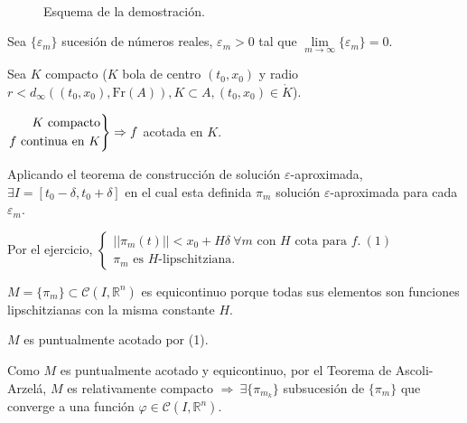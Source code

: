 \documentclass[11pt, a4paper,twoside]{article}
\makeatletter
\theoremstyle{theorem-style}  %
\renewenvironment{proof}[1][\proofname]{\par
	\pushQED{\qed}%
	\normalfont \topsep6\p@\@plus6\p@\relax
	\list{}{%
		\settowidth{\leftmargin}{\quad:\hskip\labelsep}%
		\setlength{\labelwidth}{0pt}%
		\setlength{\itemindent}{-\leftmargin}%
	}%
	\item[\hskip\labelsep\itshape#1\@addpunct{:}]\ignorespaces
}{%
	\popQED\endlist\@endpefalse
}
\theoremstyle{definition-style}
\theoremstyle{example-style}
\newenvironment{rcases}
{\left.\begin{aligned}}
	{\end{aligned}\right\rbrace}
\makeatother
\begin{document}
\begin{proof} \ \\
	\begin{figure}[h]
		\centering
		\caption{Esquema de la demostración.} \label{M2}
	\end{figure}
	Sea $ \{\varepsilon_m \} $ sucesión de números reales, $ \varepsilon_m>0  $ tal que $ \lim\limits_{m\to\infty} \{\varepsilon_m\} =0$.
	
	Sea $ K $ compacto ($ K $ bola de centro $ (t_0,x_0) $ y radio $ r<d_\infty((t_0,x_0), \text{Fr}(A)), K\subset A, (t_0,x_0) \in \mathring{K} $).
	
	$ \begin{rcases}
	K \text{ compacto}\\
	f \text{ continua en } K
	\end{rcases} \Rightarrow  f $ acotada en $ K $.
	
	Aplicando el teorema de construcción de solución $ \varepsilon $-aproximada, $ \exists I=[t_0-\delta, t_0+\delta] $ en el cual esta definida $ \pi_m $ solución  $ \varepsilon $-aproximada para cada $ \varepsilon_m $.
	
	Por el ejercicio, $ \begin{cases}
		||\pi_m(t)||< x_0+H\delta \ \forall m \text{ con } H \text{ cota para } f.\ (1)\\
		\pi_m \text{ es } H\text{-lipschitziana.}
	\end{cases} $
	
	$ M = \{\pi_m\} \subset  \mathcal{C} (I, \mathbb{R}^n)$ es equicontinuo porque todas sus elementos son funciones lipschitzianas con la misma constante $ H $.
	
	$ M $ es puntualmente acotado por (1). 
	
	Como $ M $ es puntualmente acotado y equicontinuo, por el Teorema de Ascoli-Arzelá, $ M$ es relativamente compacto $ \Rightarrow \ \exists \{\pi_{m_k}\}$ subsucesión de $ \{\pi_m\} $ que converge a una función $ \varphi\in \mathcal{C}(I, \mathbb{R}^n) $.
	

\end{proof}
\end{document}
